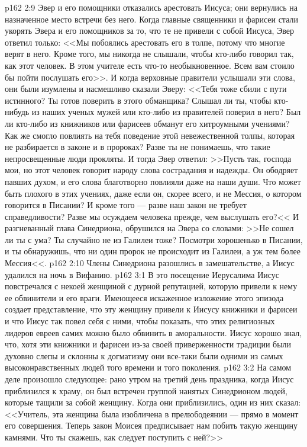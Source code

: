 \vs p162 2:9 Эвер и его помощники отказались арестовать Иисуса; они вернулись на назначенное место встречи без него. Когда главные священники и фарисеи стали укорять Эвера и его помощников за то, что те не привели с собой Иисуса, Эвер ответил только: <<Мы побоялись арестовать его в толпе, потому что многие верят в него. Кроме того, мы никогда не слышали, чтобы кто\hyp{}либо говорил так, как этот человек. В этом учителе есть что\hyp{}то необыкновенное. Всем вам стоило бы пойти послушать его>>. И когда верховные правители услышали эти слова, они были изумлены и насмешливо сказали Эверу: <<Тебя тоже сбили с пути истинного? Ты готов поверить в этого обманщика? Слышал ли ты, чтобы кто\hyp{}нибудь из наших ученых мужей или кто\hyp{}либо из правителей поверил в него? Был ли кто\hyp{}либо из книжников или фарисеев обманут его хитроумными учениями? Как же смогло повлиять на тебя поведение этой невежественной толпы, которая не разбирается в законе и в пророках? Разве ты не понимаешь, что такие непросвещенные люди прокляты. И тогда Эвер ответил: >>Пусть так, господа мои, но этот человек говорит народу слова сострадания и надежды. Он ободряет павших духом, и его слова благотворно повлияли даже на наши души. Что может быть плохого в этих учениях, даже если он, скорее всего, и не Мессия, о котором говорится в Писании? И кроме того --- разве наш закон не требует справедливости? Разве мы осуждаем человека прежде, чем выслушать его?<< И разгневанный глава Синедриона, обрушился на Эвера со словами: >>Не сошел ли ты с ума? Ты случайно не из Галилеи тоже? Посмотри хорошенько в Писании, и ты обнаружишь, что ни один пророк не происходит из Галилеи, а уж тем более Мессия<<.
\vs p162 2:10 Члены Синедриона разошлись в замешательстве, а Иисус удалился на ночь в Вифанию.
\vs p162 3:1 В это посещение Иерусалима Иисус повстречался с некоей женщиной с дурной репутацией, которую привели к нему ее обвинители и его враги. Имеющееся искаженное изложение этого эпизода создает представление, что эту женщину привели к Иисусу книжники и фарисеи и что Иисус так повел себя с ними, чтобы показать, что этих религиозных лидеров евреев самих можно было обвинить в аморальности. Иисус хорошо знал, что, хотя эти книжники и фарисеи из\hyp{}за своей приверженности традиции были духовно слепы и склонны к догматизму они все\hyp{}таки были одними из самых высоконравственных людей того времени и того поколения.
\vs p162 3:2 На самом деле произошло следующее: рано утром на третий день праздника, когда Иисус приблизился к храму, он был встречен группой нанятых Синедрионом людей, которые тащили за собой женщину. Когда они приблизились, один из них сказал: <<Учитель, эта женщина была изобличена в прелюбодеянии --- прямо в момент его совершения. Теперь закон Моисея предписывает нам побить такую женщину камнями. Что ты скажешь, как следует поступить с ней?>>
